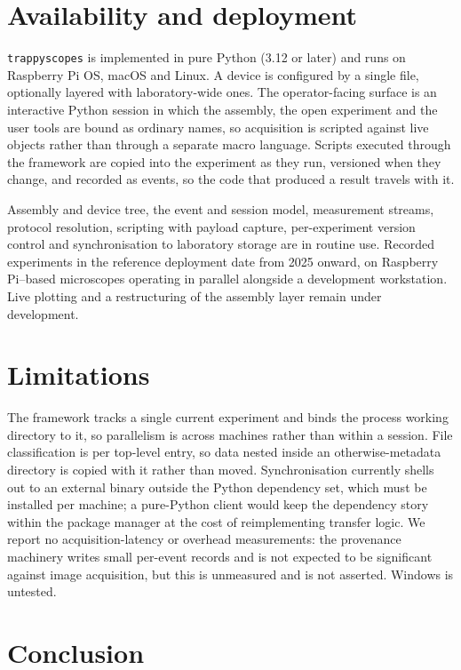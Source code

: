 \documentclass[10pt,a4paper,twocolumn]{article}
\begin{document}
\section{Availability and deployment}

\texttt{trappyscopes} is implemented in pure Python (3.12 or later) and runs on
Raspberry Pi OS, macOS and Linux. A device is configured by a single file, optionally
layered with laboratory-wide ones. The operator-facing surface is an interactive Python
session in which the assembly, the open experiment and the user tools are bound as
ordinary names, so acquisition is scripted against live objects rather than through a
separate macro language. Scripts executed through the framework are copied into the
experiment as they run, versioned when they change, and recorded as events, so the code
that produced a result travels with it.

Assembly and device tree, the event and session model, measurement streams, protocol
resolution, scripting with payload capture, per-experiment version control and
synchronisation to laboratory storage are in routine use. Recorded experiments in the
reference deployment date from 2025 onward, on Raspberry Pi--based microscopes operating
in parallel alongside a development workstation. Live plotting and a restructuring of
the assembly layer remain under development.

\section{Limitations}

The framework tracks a single current experiment and binds the process working
directory to it, so parallelism is across machines rather than within a session. File
classification is per top-level entry, so data nested inside an otherwise-metadata
directory is copied with it rather than moved. Synchronisation currently shells out to
an external binary outside the Python dependency set, which must be installed per
machine; a pure-Python client would keep the dependency story within the package
manager at the cost of reimplementing transfer logic. We report no acquisition-latency
or overhead measurements: the provenance machinery writes small per-event records and
is not expected to be significant against image acquisition, but this is unmeasured and
is not asserted. Windows is untested.

\section{Conclusion}
\end{document}
